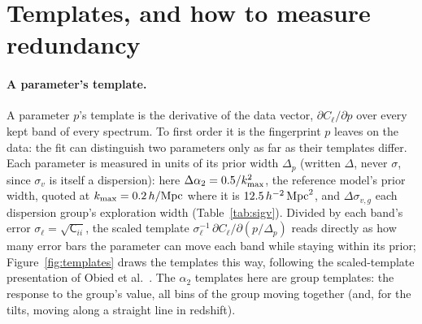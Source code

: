 \documentclass[11pt]{article}
\newcommand{\Cov}{\mathsf{C}}
\newcommand{\kmax}{k_{\rm max}}
\newcommand{\hMpc}{\,h/{\rm Mpc}}
\newcommand{\aunit}{\,h^{-2}\,{\rm Mpc}^2}
\newcommand{\sv}{\sigma_v}
\begin{document}
\section{Templates, and how to measure redundancy}
\label{sec:method}

\paragraph{A parameter's template.}
A parameter $p$'s template is the derivative of the data vector,
$\partial C_\ell/\partial p$ over every kept band of every spectrum.
To first order it is the fingerprint $p$ leaves on the data: the fit
can distinguish two parameters only as far as their templates differ.
Each parameter is measured in units of its prior width $\Delta_p$
(written $\Delta$, never $\sigma$, since $\sv$ is itself a
dispersion): here $\Delta\alpha_2 = 0.5/\kmax^2$, the reference
model's prior width, quoted at $\kmax = 0.2\hMpc$ where it is
$12.5\aunit$, and
$\Delta\sigma_{v,g}$ each dispersion group's exploration width
(Table~\ref{tab:sigv}).  Divided by each band's error
$\sigma_\ell = \sqrt{\Cov_{ii}}$, the scaled template
$\sigma_\ell^{-1}\,\partial C_\ell/\partial(p/\Delta_p)$ reads
directly as how many error bars the parameter can move each band while
staying within its prior; Figure~\ref{fig:templates} draws the
templates this way, following the scaled-template presentation of
Obied et al.~\cite{Obied2017}.  The $\alpha_2$ templates here are group
templates: the response to the group's value, all bins of the group
moving together (and, for the tilts, moving along a straight line in
redshift).
\end{document}
